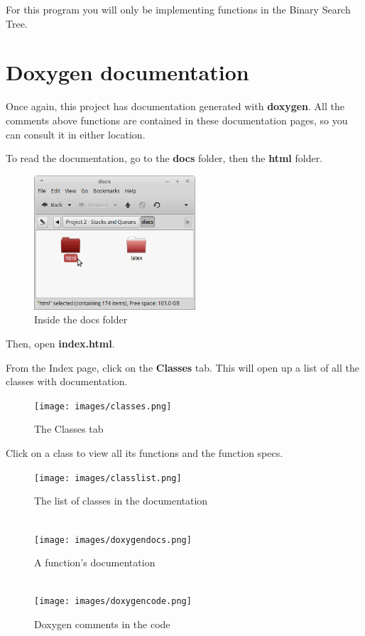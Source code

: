 \documentclass[a4paper,12pt,oneside]{book}
\begin{document}
    For this program you will only be implementing functions in the Binary Search Tree.

    \newpage

    \section{Doxygen documentation}

    Once again, this project has documentation generated with \textbf{doxygen}.
    All the comments above functions are contained in these documentation pages,
    so you can consult it in either location.

    To read the documentation, go to the \textbf{docs} folder, then the \textbf{html} folder.

    \begin{figure}[h]
        \center
        \includegraphics[width=6cm]{images/project2-docsfolder.png}
        \caption{Inside the docs folder}
    \end{figure}

    Then, open \textbf{index.html}.

    From the Index page, click on the \textbf{Classes} tab.
    This will open up a list of all the classes with documentation.

    \begin{figure}[h]
        \center
        \texttt{[image: images/classes.png]}
        \caption{The Classes tab}
    \end{figure}

    Click on a class to view all its functions and the function specs.

    \newpage

    \begin{figure}[h]
        \center
        \texttt{[image: images/classlist.png]}
        \caption{The list of classes in the documentation}
        
        ~\\
        \texttt{[image: images/doxygendocs.png]}
        \caption{A function's documentation}

        ~\\
        \texttt{[image: images/doxygencode.png]}
        \caption{Doxygen comments in the code}
    \end{figure}
\end{document}
